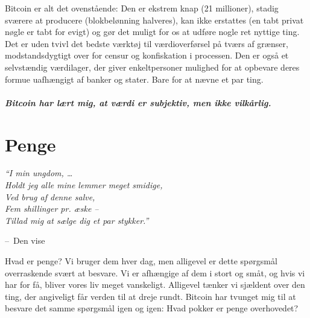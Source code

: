 \documentclass[paper=6in:9in,pagesize=pdftex,
               headinclude=on,footinclude=on,12pt]{scrbook}
\makeatletter
\newenvironment{chapquote}[2][4em]{\setlength{\@tempdima}{#1}%
   \def\chapquote@author{#2}%
   \parshape 1 \@tempdima \dimexpr\textwidth-2\@tempdima\relax%
   \itshape}{\par\normalfont\hfill--\ \chapquote@author\hspace*{\@tempdima}\par\bigskip}
\makeatother
\begin{document}
Bitcoin er alt det ovenstående: Den er ekstrem knap (21 millioner), stadig sværere at producere (blokbelønning halveres), kan ikke erstattes (en tabt privat nøgle er tabt for evigt) og gør det muligt for os at udføre nogle ret nyttige ting. Det er uden tvivl det bedste værktøj til værdioverførsel på tværs af grænser, modstandsdygtigt over for censur og konfiskation i processen. Den er også et selvstændig værdilager, der giver enkeltpersoner mulighed for at opbevare deres formue uafhængigt af banker og stater. Bare for at nævne et par ting.\paragraph{Bitcoin har lært mig, at værdi er subjektiv, men ikke vilkårlig.}%
%
%
%
%

\chapter{Penge}
\label{les:11}

\begin{chapquote}{Den vise}
\enquote{I min ungdom, \ldots \\ Holdt jeg alle mine lemmer meget smidige, \\ Ved brug af denne salve, \\ Fem shillinger pr. æske -- \\ Tillad mig at sælge dig et par stykker.}
\end{chapquote}

Hvad er penge? Vi bruger dem hver dag, men alligevel er dette spørgsmål overraskende svært at besvare. Vi er afhængige af dem i stort og småt, og hvis vi har for få, bliver vores liv meget vanskeligt. Alligevel tænker vi sjældent over den ting, der angiveligt får verden til at dreje rundt. Bitcoin har tvunget mig til at besvare det samme spørgsmål igen og igen: Hvad pokker er penge overhovedet?
\end{document}
